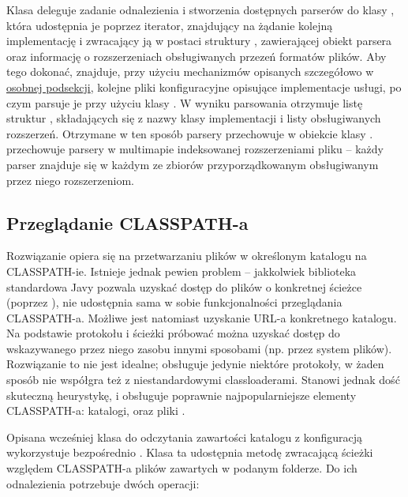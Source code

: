 Klasa  deleguje zadanie odnalezienia i stworzenia dostępnych parserów do klasy
, która udostępnia je poprzez iterator, znajdujący na żądanie kolejną
implementację i zwracający ją w postaci struktury , zawierającej obiekt parsera
oraz informację o rozszerzeniach obsługiwanych przezeń formatów plików. Aby tego dokonać,
 znajduje, przy użyciu mechanizmów opisanych szczegółowo w
\hyperref[sec:skaner_classpath]{osobnej podsekcji}, kolejne pliki konfiguracyjne opisujące
implementacje usługi, po czym parsuje je przy użyciu klasy . W wyniku
parsowania otrzymuje listę struktur , składających się z nazwy klasy
implementacji i listy obsługiwanych rozszerzeń. Otrzymane w ten sposób parsery 
przechowuje w obiekcie klasy .  przechowuje parsery w
multimapie indeksowanej rozszerzeniami pliku -- każdy parser znajduje się w każdym ze zbiorów
przyporządkowanym obsługiwanym przez niego rozszerzeniom.

\subsection{Przeglądanie CLASSPATH-a}
\label{sec:skaner_classpath}

Rozwiązanie opiera się na przetwarzaniu plików w określonym katalogu na CLASSPATH-ie. Istnieje
jednak pewien problem -- jakkolwiek biblioteka standardowa Javy pozwala uzyskać dostęp do plików o
konkretnej ścieżce (poprzez ), nie udostępnia sama w sobie
funkcjonalności przeglądania CLASSPATH-a. Możliwe jest natomiast uzyskanie URL-a konkretnego
katalogu. Na podstawie protokołu i ścieżki próbować można uzyskać dostęp do wskazywanego przez niego
zasobu innymi sposobami (np. przez system plików). Rozwiązanie to nie jest idealne; obsługuje
jedynie niektóre protokoły, w żaden sposób nie współgra też z niestandardowymi classloaderami.
Stanowi jednak dość skuteczną heurystykę, i obsługuje poprawnie najpopularniejsze elementy
CLASSPATH-a: katalogi, oraz pliki .



Opisana wcześniej klasa  do odczytania zawartości katalogu z konfiguracją
wykorzystuje bezpośrednio . Klasa ta udostępnia metodę zwracającą ścieżki
względem CLASSPATH-a plików zawartych w podanym folderze. Do ich odnalezienia potrzebuje dwóch
operacji:

